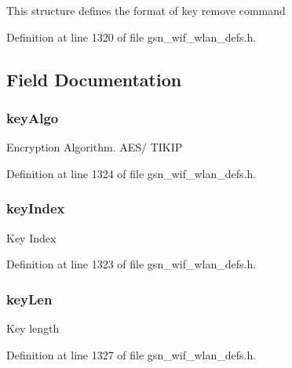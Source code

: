 This structure defines the format of key remove command 

Definition at line 1320 of file gsn\_\-wif\_\-wlan\_\-defs.h.



\subsection{Field Documentation}
\hypertarget{a00387_a53fe92daed71e812f41e8b404d4da106}{
\subsubsection[{keyAlgo}]{ {\bf keyAlgo}}}
\label{a00387_a53fe92daed71e812f41e8b404d4da106}
Encryption Algorithm. AES/ TIKIP 

Definition at line 1324 of file gsn\_\-wif\_\-wlan\_\-defs.h.

\hypertarget{a00387_afcf93136bff6ef3037dec249b48d1eba}{
\subsubsection[{keyIndex}]{ {\bf keyIndex}}}
\label{a00387_afcf93136bff6ef3037dec249b48d1eba}
Key Index 

Definition at line 1323 of file gsn\_\-wif\_\-wlan\_\-defs.h.

\hypertarget{a00387_a19c67de3f96782516f1c496a77e01074}{
\subsubsection[{keyLen}]{ {\bf keyLen}}}
\label{a00387_a19c67de3f96782516f1c496a77e01074}
Key length 

Definition at line 1327 of file gsn\_\-wif\_\-wlan\_\-defs.h.

